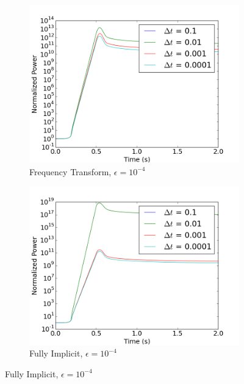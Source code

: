 \documentclass[12pt]{report}
\begin{document}
\begin{figure}[ht]
			\begin{subfigure}{.5\textwidth}
				\centering
				\includegraphics[width=.95\linewidth]{figs/power_case2_conv2.png}
				\caption{Frequency Transform, $\epsilon = 10^{-4}$}
				\label{fig::power_2_2_ft}
			\end{subfigure}%
			\begin{subfigure}{.5\textwidth}
				\centering
				\includegraphics[width=.95\linewidth]{figs/power_case2_conv2_omega0.png}
				\caption{Fully Implicit, $\epsilon = 10^{-4}$}
				\label{fig::power_2_2_fi}
			\end{subfigure}
			

\end{figure}
\end{document}
